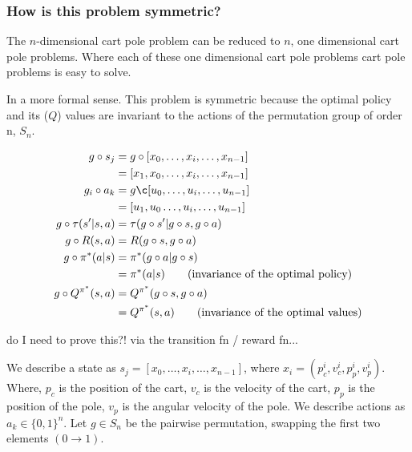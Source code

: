 
\subsubsection{How is this problem symmetric?}

The $n$-dimensional cart pole problem can be reduced to $n$, one dimensional cart pole problems.
Where each of these one dimensional cart pole problems cart pole problems is easy to solve.

In a more formal sense. This problem is symmetric because the optimal policy and its ($Q$) values are invariant to the actions of the permutation group of order n, $S_n$.

\begin{align*}
g \circ s_j &= g \circ [x_0, \dots, x_i, \dots, x_{n-1}] \\
&= [x_1, x_0, \dots, x_i, \dots, x_{n-1}] \\
g_i \circ a_k &= g \c[u_0, \dots, u_i, \dots, u_{n-1}] \\
&= [u_1, u_0 \dots, u_i, \dots, u_{n-1}] \\
g\circ \tau(s'|s, a) &= \tau(g\circ s'|g\circ s, g\circ a) \\
g\circ R(s, a) &= R(g\circ s, g\circ a) \\
g\circ \pi^{* }(a|s) &= \pi^{* }(g\circ a| g\circ s) \\
&= \pi^{* }(a|s) \tag{invariance of the optimal policy}\\
g\circ Q^{\pi^{* }}(s, a) &= Q^{\pi^{* }}(g\circ s, g\circ a) \\
&= Q^{\pi^{* }}(s, a) \tag{invariance of the optimal values}
\end{align*}

{\color{red}do I need to prove this?! via the transition fn / reward fn...}

We describe a state as $s_j = [x_0, \dots, x_i, \dots, x_{n-1}]$, where $x_i = (p_c^i, v_c^i, p_p^i, v_p^i)$. Where, $p_c$ is the position of the cart, $v_c$ is the velocity of the cart, $p_p$ is the position of the pole, $v_p$ is the angular velocity of the pole. We describe actions as $a_k \in \{0, 1\}^n$. Let $g\in S_n$ be the pairwise permutation, swapping the first two elements $(0\to 1)$.


